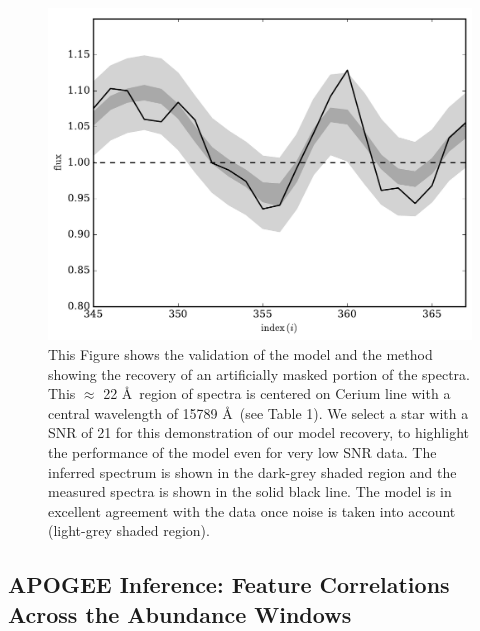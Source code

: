 \documentclass[a4paper,fleqn,usenatbib]{mnras}
\begin{document}
\begin{figure}
	\includegraphics[width=\columnwidth]{apogee_centers_final_29502_spc_rec_test_recovery_zoom.pdf}
    \caption{This Figure shows the validation of the model and the method showing the recovery of an artificially masked portion of the spectra. This $\approx$ 22 \AA\ region of spectra is centered on Cerium line with a central wavelength of 15789 \AA\ (see Table 1). We select a star with a SNR of 21 for this demonstration of our model recovery, to highlight the performance of the model even for very low SNR data. The inferred spectrum is shown in the dark-grey shaded region and the measured spectra is shown in the solid black line. The model is in excellent agreement with the data once noise is taken into account (light-grey shaded region).}
    \label{fig:recovery_test}
\end{figure}

\subsection{APOGEE Inference: Feature Correlations Across the Abundance Windows}
\end{document}
